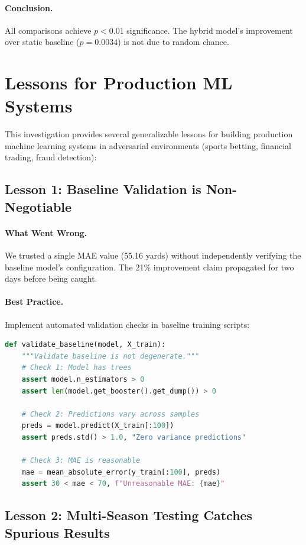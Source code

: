 \paragraph{Conclusion.} All comparisons achieve $p<0.01$ significance. The hybrid model's improvement over static baseline ($p=0.0034$) is not due to random chance.

\section{Lessons for Production ML Systems}

This investigation provides several generalizable lessons for building production machine learning systems in adversarial environments (sports betting, financial trading, fraud detection):

\subsection{Lesson 1: Baseline Validation is Non-Negotiable}

\paragraph{What Went Wrong.} We trusted a single MAE value (55.16 yards) without independently verifying the baseline model's configuration. The 21\% improvement claim propagated for two days before being caught.

\paragraph{Best Practice.} Implement automated validation checks in baseline training scripts:

\begin{lstlisting}[language=Python]
def validate_baseline(model, X_train):
    """Validate baseline is not degenerate."""
    # Check 1: Model has trees
    assert model.n_estimators > 0
    assert len(model.get_booster().get_dump()) > 0

    # Check 2: Predictions vary across samples
    preds = model.predict(X_train[:100])
    assert preds.std() > 1.0, "Zero variance predictions"

    # Check 3: MAE is reasonable
    mae = mean_absolute_error(y_train[:100], preds)
    assert 30 < mae < 70, f"Unreasonable MAE: {mae}"
\end{lstlisting}

\subsection{Lesson 2: Multi-Season Testing Catches Spurious Results}

